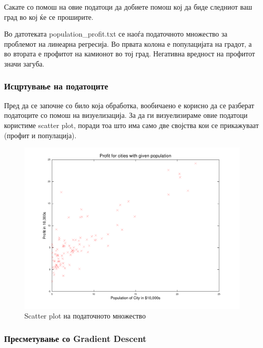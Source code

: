 \documentclass[12pt,a4paper]{article}
\begin{document}
Сакате со помош на овие податоци да добиете помош кој да биде следниот ваш град
во кој ќе се проширите.

Во датотеката population\_profit.txt се наоѓа податочното множество за проблемот
на линеарна регресија. Во првата колона е популацијата на градот, а во втората е
профитот на камионот во тој град. Негативна вредност на профитот значи загуба.

\subsubsection{Исцртување на податоците}

Пред да се започне со било која обработка, вообичаено е корисно да се разберат
податоците со помош на визуелизација. За да ги визуелизираме овие податоци
користиме scatter plot, поради тоа што има само две својства кои се прикажуваат
(профит и популација).








\begin{figure}[htb]
\centering
\includegraphics[width=.9\textwidth]{src/data}
\caption{Scatter plot на податочното множество}
\label{fig:plot}
\end{figure}

\subsubsection{Пресметување со Gradient Descent}
\end{document}
